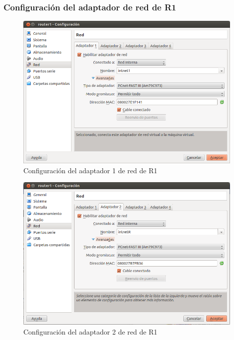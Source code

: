 \documentclass[a4paper,10pt]{article}
\begin{document}
			\subsubsection{Configuración del adaptador de red de R1}	
	\begin{figure}[!htb]
		\centering
		\includegraphics[width=11cm]{Imagenes/router1ConfigAdaptador1.png}
		\caption{Configuración del adaptador 1 de red de R1} \label{img008}
	\end{figure}
	\begin{figure}[!htb]
		\centering
		\includegraphics[width=11cm]{Imagenes/Router1ConfigAdaptador2.png}
		\caption{Configuración del adaptador 2 de red de R1} \label{img009}
	\end{figure}
	
\end{document}
